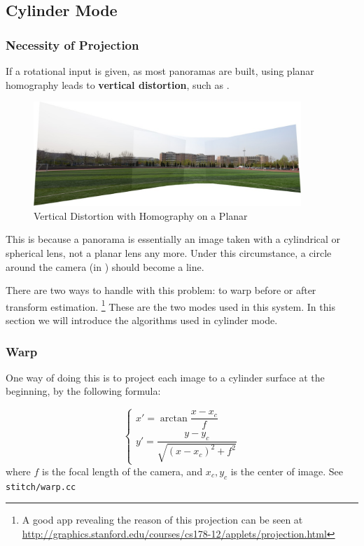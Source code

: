
\subsection{Cylinder Mode}
\label{sec:cylinder}
\subsubsection{Necessity of Projection}
If a rotational input is given, as most panoramas are built,
using planar homography leads to \textbf{vertical distortion}, such as .
\begin{figure}[H]
  \centering
  \includegraphics[width=0.9\textwidth]{res/distort.png}
  \caption{Vertical Distortion with Homography on a Planar\label{fig:distort}}
\end{figure}

This is because a panorama is essentially an image taken with
a cylindrical or spherical lens, not a planar lens any more.
Under this circumstance, a circle around the camera (in ) should
become a line.

There are two ways to handle with this problem: to warp before or after
transform estimation.
\footnote{A good app revealing the reason of this projection can be seen at \url{http://graphics.stanford.edu/courses/cs178-12/applets/projection.html}}
These are the two modes used in this system. In this section we will
introduce the algorithms used in cylinder mode.

\subsubsection{Warp}
One way of doing this is to project each image
to a cylinder surface at the beginning, by the following formula:

\[  \begin{cases}
    x' = \arctan{\dfrac{x-x_c}{f}}\\
    y' = \dfrac{y-y_c}{\sqrt{(x-x_c)^2 + f^2}}
  \end{cases}\]
where $ f$ is the focal length of the camera, and $ x_c, y_c$ is the center of image.
See \verb|stitch/warp.cc|

